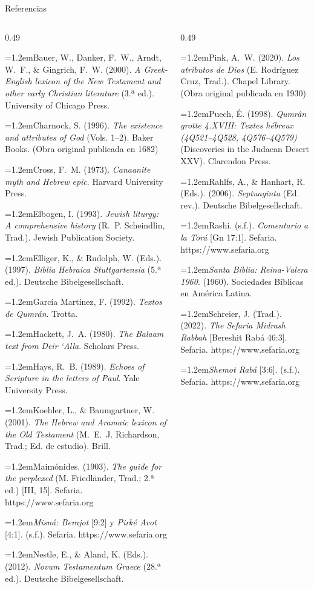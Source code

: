 \documentclass[hyperref={bookmarks=false},aspectratio=169]{beamer}
\newcommand{\refapa}[1]{\par{\RaggedRight\hangindent=1.2em\hangafter=1\noindent #1\par}\vspace{3pt}}
\begin{document}
\begin{frame}{Referencias}
\fontsize{5.4}{6.4}\selectfont
\begin{columns}[t,onlytextwidth]
\begin{column}{0.49\textwidth}
\refapa{Bauer, W., Danker, F.~W., Arndt, W.~F., \& Gingrich, F.~W. (2000). \emph{A Greek-English lexicon of the New Testament and other early Christian literature} (3.ª ed.). University of Chicago Press.}
\refapa{Charnock, S. (1996). \emph{The existence and attributes of God} (Vols. 1--2). Baker Books. (Obra original publicada en 1682)}
\refapa{Cross, F.~M. (1973). \emph{Canaanite myth and Hebrew epic}. Harvard University Press.}
\refapa{Elbogen, I. (1993). \emph{Jewish liturgy: A comprehensive history} (R.~P. Scheindlin, Trad.). Jewish Publication Society.}
\refapa{Elliger, K., \& Rudolph, W. (Eds.). (1997). \emph{Biblia Hebraica Stuttgartensia} (5.ª ed.). Deutsche Bibelgesellschaft.}
\refapa{García Martínez, F. (1992). \emph{Textos de Qumrán}. Trotta.}
\refapa{Hackett, J.~A. (1980). \emph{The Balaam text from Deir `Alla}. Scholars Press.}
\refapa{Hays, R.~B. (1989). \emph{Echoes of Scripture in the letters of Paul}. Yale University Press.}
\refapa{Koehler, L., \& Baumgartner, W. (2001). \emph{The Hebrew and Aramaic lexicon of the Old Testament} (M.~E.~J. Richardson, Trad.; Ed. de estudio). Brill.}
\refapa{Maimónides. (1903). \emph{The guide for the perplexed} (M. Friedländer, Trad.; 2.ª ed.) [III, 15]. Sefaria. https://www.sefaria.org}
\refapa{\emph{Misná: Berajot} [9:2] y \emph{Pirké Avot} [4:1]. (s.f.). Sefaria. https://www.sefaria.org}
\refapa{Nestle, E., \& Aland, K. (Eds.). (2012). \emph{Novum Testamentum Graece} (28.ª ed.). Deutsche Bibelgesellschaft.}
\end{column}
\begin{column}{0.49\textwidth}
\refapa{Pink, A.~W. (2020). \emph{Los atributos de Dios} (E. Rodríguez Cruz, Trad.). Chapel Library. (Obra original publicada en 1930)}
\refapa{Puech, É. (1998). \emph{Qumrân grotte 4.XVIII: Textes hébreux (4Q521--4Q528, 4Q576--4Q579)} (Discoveries in the Judaean Desert XXV). Clarendon Press.}
\refapa{Rahlfs, A., \& Hanhart, R. (Eds.). (2006). \emph{Septuaginta} (Ed. rev.). Deutsche Bibelgesellschaft.}
\refapa{Rashi. (s.f.). \emph{Comentario a la Torá} [Gn 17:1]. Sefaria. https://www.sefaria.org}
\refapa{\emph{Santa Biblia: Reina-Valera 1960}. (1960). Sociedades Bíblicas en América Latina.}
\refapa{Schreier, J. (Trad.). (2022). \emph{The Sefaria Midrash Rabbah} [Bereshit Rabá 46:3]. Sefaria. https://www.sefaria.org}
\refapa{\emph{Shemot Rabá} [3:6]. (s.f.). Sefaria. https://www.sefaria.org}

\end{column}
\end{columns}
\end{frame}
\end{document}
